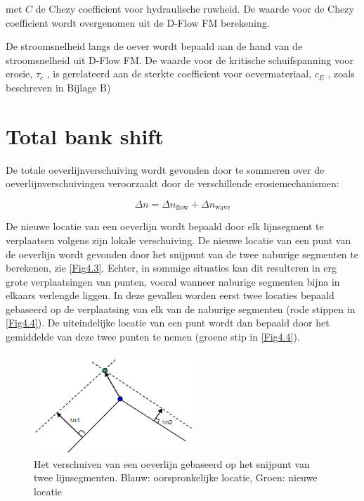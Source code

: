 met $C$  de Chezy coefficient voor hydraulische ruwheid.
De waarde voor de Chezy coefficient wordt overgenomen uit de D-Flow FM berekening.

De stroomsnelheid langs de oever wordt bepaald aan de hand van de stroomsnelheid uit D-Flow FM.
De waarde voor de kritische schuifspanning voor erosie, $\tau_c$ , is gerelateerd aan de sterkte coefficient voor oevermateriaal, $c_E$ , zoals beschreven in Bijlage B)

\section{Total bank shift} \label{Sec4.3}

De totale oeverlijnverschuiving wordt gevonden door te sommeren over de oeverlijnverschuivingen veroorzaakt door de verschillende erosiemechanismen:

\begin{equation}
\Delta n = \Delta n_\text{flow} + \Delta n_\text{wave}
\end{equation}

De nieuwe locatie van een oeverlijn wordt bepaald door elk lijnsegment te verplaatsen volgens zijn lokale verschuiving.
De nieuwe locatie van een punt van de oeverlijn wordt gevonden door het snijpunt van de twee naburige segmenten te berekenen, zie \autoref{Fig4.3}.
Echter, in sommige situaties kan dit resulteren in erg grote verplaatsingen van punten, vooral wanneer naburige segmenten bijna in elkaars verlengde liggen.
In deze gevallen worden eerst twee locaties bepaald gebaseerd op de verplaatsing van elk van de naburige segmenten (rode stippen in \autoref{Fig4.4}).
De uiteindelijke locatie van een punt wordt dan bepaald door het gemiddelde van deze twee punten te nemen (groene stip in \autoref{Fig4.4}).


\begin{figure}
\includegraphics[width=6cm]{figures/Fig4-3.png}
\caption{Het verschuiven van een oeverlijn gebaseerd op het snijpunt van twee lijnsegmenten.
Blauw: oorspronkelijke locatie, Groen: nieuwe locatie}
\label{Fig4.3}
\end{figure}

